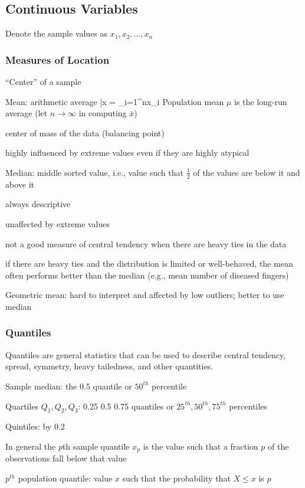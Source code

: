 \subsection{Continuous Variables} 
Denote the sample values as $x_{1}, x_{2}, \ldots, x_{n}$
\subsubsection{Measures of Location}
``Center'' of a sample
\bi
\item Mean: arithmetic average
\beq
\bar{x} = \sum_{i=1}^{n}x_{i}
\eeq
Population mean $\mu$ is the long-run average (let $n \rightarrow
\infty$ in computing $\bar{x}$) \\
 \bi
 \item center of mass of the data (balancing point)
 \item highly influenced by extreme values even if they are highly
   atypical
 \ei
\item Median: middle sorted value, i.e., value such that $\frac{1}{2}$
  of the values are below it and above it
 \bi
 \item always descriptive
 \item unaffected by extreme values
 \item not a good measure of central tendency when there are heavy
   ties in the data
 \item if there are heavy ties and the distribution is limited or
   well-behaved, the mean often performs better than the median (e.g.,
   mean number of diseased fingers)
 \ei
\item Geometric mean: hard to interpret and affected by low outliers;
  better to use median
\ei

\subsubsection{Quantiles}
Quantiles are general statistics that can be used to describe central
tendency, spread, symmetry, heavy tailedness, and other quantities.
\bi
\item Sample median: the 0.5 quantile or $50^{th}$ percentile
\item Quartiles $Q_{1}, Q_{2}, Q_{3}$: 0.25 0.5 0.75 quantiles or
  $25^{th}, 50^{th}, 75^{th}$ percentiles
\item Quintiles: by 0.2
\item In general the $p$th sample quantile $x_{p}$ is the value such that a
  fraction $p$ of the observations fall below that value \\
\item $p^{th}$ population quantile: value $x$ such that the
  probability that $X \leq x$ is $p$
\ei

